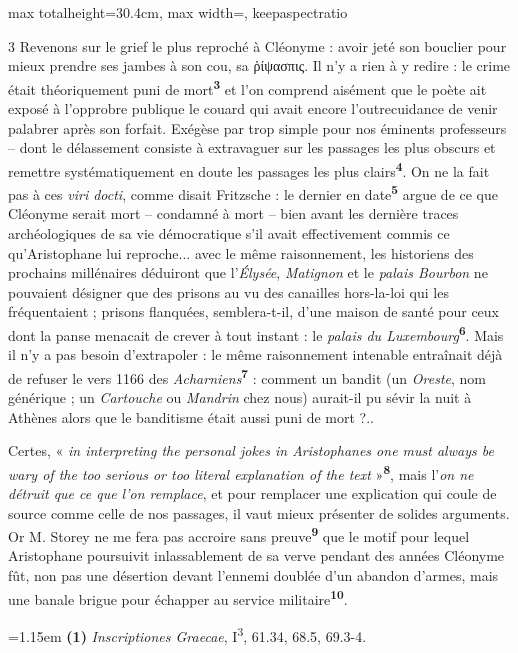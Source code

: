 \documentclass[11pt,twoside]{book}
\newcommand{\italique}[1]{\textit{#1}}
\newcommand{\expo}[1]{\textsuperscript{#1}}
\newcommand{\grec}[1]{{\policeGr #1}}
\newcommand{\anglais}[1]{\textit{#1}}
\newcommand{\marqueur}[1]{\textsuperscript{\color{rubricRed}\textbf{#1}}}
\begin{document}
\begin{adjustbox}{max totalheight=30.4cm, max width=\textwidth, keepaspectratio}
\begin{minipage}{\textwidth}
{\begin{multicols}{3}
\noindent Revenons sur le grief le plus reproché à Cléonyme : avoir jeté son bouclier pour mieux prendre ses jambes à son cou, sa \grec{ῥίψασπις}. Il n'y a rien à y redire : le crime était théoriquement puni de mort\marqueur{3} et l'on comprend aisément que le poète ait exposé à l'opprobre publique le couard qui avait encore l'outrecuidance de venir palabrer après son forfait. Exégèse par trop simple pour nos éminents professeurs – dont le délassement consiste à extravaguer sur les passages les plus obscurs et remettre systématiquement en doute les passages les plus clairs\marqueur{4}. On ne la fait pas à ces \italique{viri docti}, comme disait Fritzsche : le dernier en date\marqueur{5} argue de ce que Cléonyme serait mort – condamné à mort – bien avant les dernière traces archéologiques de sa vie démocratique s'il avait effectivement commis ce qu'Aristophane lui reproche... avec le même raisonnement, les historiens des prochains millénaires déduiront que l'\italique{Élysée}, \italique{Matignon} et le \italique{palais Bourbon} ne pouvaient désigner que des prisons au vu des canailles hors-la-loi qui les fréquentaient ; prisons flanquées, semblera-t-il, d'une maison de santé pour ceux dont la panse menacait de crever à tout instant : le \italique{palais du Luxembourg}\marqueur{6}. Mais il n'y a pas besoin d'extrapoler : le même raisonnement intenable entraînait déjà de refuser le vers 1166 des \italique{Acharniens}\marqueur{7} : comment un bandit (un \italique{Oreste}, nom générique ; un \italique{Cartouche} ou \italique{Mandrin} chez nous) aurait-il pu sévir la nuit à Athènes alors que le banditisme était aussi puni de mort ?..
\par\vspace{1.5pt}
\noindent Certes, « \anglais{in interpreting the personal jokes in Aristophanes one must always be wary of the too serious or too literal explanation of the text} »\marqueur{8}, mais l'\italique{on ne détruit que ce que l'on remplace}, et pour remplacer une explication qui coule de source comme celle de nos passages, il vaut mieux présenter de solides arguments. Or M. Storey ne me fera pas accroire sans preuve\marqueur{9} que le motif pour lequel Aristophane poursuivit inlassablement de sa verve pendant des années Cléonyme fût, non pas une désertion devant l'ennemi doublée d'un abandon d'armes, mais une banale brigue pour échapper au service militaire\marqueur{10}.
\par\vspace{1.5pt}
\par\vspace{1.2pt}\par\nopagebreak\vspace{1pt}\noindent\hangindent=1.15em {\color{sepiaNote}\textbf{(1)}} \italique{Inscriptiones Graecae}, I\expo{3}, 61.34, 68.5, 69.3-4.

\end{multicols}}
\end{minipage}
\end{adjustbox}
\end{document}
